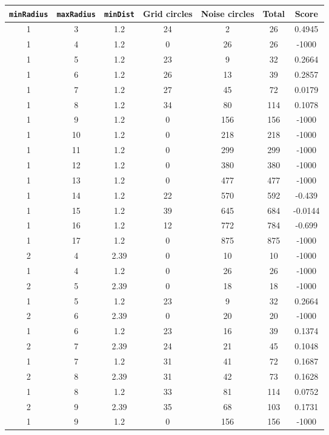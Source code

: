 \documentclass[letterpaper, 12pt]{article}
\begin{document}
\begin{longtable}{|c|c|c|c|c|c|c|}
\hline
\textbf{\texttt{minRadius}} & \textbf{\texttt{maxRadius}} & \textbf{\texttt{minDist}} & \textbf{Grid circles} & \textbf{Noise circles} & \textbf{Total} & \textbf{Score} \\
\hline
1 & 3 & 1.2 & 24 & 2 & 26 & 0.4945 \\
\hline
1 & 4 & 1.2 & 0 & 26 & 26 & -1000 \\
\hline
1 & 5 & 1.2 & 23 & 9 & 32 & 0.2664 \\
\hline
1 & 6 & 1.2 & 26 & 13 & 39 & 0.2857 \\
\hline
1 & 7 & 1.2 & 27 & 45 & 72 & 0.0179 \\
\hline
1 & 8 & 1.2 & 34 & 80 & 114 & 0.1078 \\
\hline
1 & 9 & 1.2 & 0 & 156 & 156 & -1000 \\
\hline
1 & 10 & 1.2 & 0 & 218 & 218 & -1000 \\
\hline
1 & 11 & 1.2 & 0 & 299 & 299 & -1000 \\
\hline
1 & 12 & 1.2 & 0 & 380 & 380 & -1000 \\
\hline
1 & 13 & 1.2 & 0 & 477 & 477 & -1000 \\
\hline
1 & 14 & 1.2 & 22 & 570 & 592 & -0.439 \\
\hline
1 & 15 & 1.2 & 39 & 645 & 684 & -0.0144 \\
\hline
1 & 16 & 1.2 & 12 & 772 & 784 & -0.699 \\
\hline
1 & 17 & 1.2 & 0 & 875 & 875 & -1000 \\
\hline
2 & 4 & 2.39 & 0 & 10 & 10 & -1000 \\
\hline
1 & 4 & 1.2 & 0 & 26 & 26 & -1000 \\
\hline
2 & 5 & 2.39 & 0 & 18 & 18 & -1000 \\
\hline
1 & 5 & 1.2 & 23 & 9 & 32 & 0.2664 \\
\hline
2 & 6 & 2.39 & 0 & 20 & 20 & -1000 \\
\hline
1 & 6 & 1.2 & 23 & 16 & 39 & 0.1374 \\
\hline
2 & 7 & 2.39 & 24 & 21 & 45 & 0.1048 \\
\hline
1 & 7 & 1.2 & 31 & 41 & 72 & 0.1687 \\
\hline
2 & 8 & 2.39 & 31 & 42 & 73 & 0.1628 \\
\hline
1 & 8 & 1.2 & 33 & 81 & 114 & 0.0752 \\
\hline
2 & 9 & 2.39 & 35 & 68 & 103 & 0.1731 \\
\hline
1 & 9 & 1.2 & 0 & 156 & 156 & -1000 \\

\end{longtable}
\end{document}
